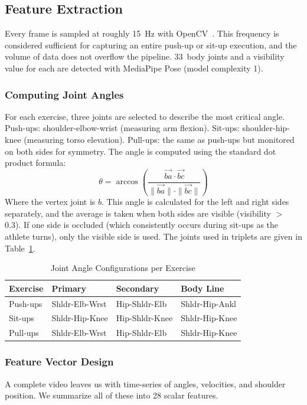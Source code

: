 \documentclass[conference]{IEEEtran}
\begin{document}
\subsection{Feature Extraction}

Every frame is sampled at roughly 15~Hz with OpenCV~\cite{bradski2000}. This frequency is considered sufficient for capturing an entire push-up or sit-up execution, and the volume of data does not overflow the pipeline. 33~body joints and a visibility value for each are detected with MediaPipe Pose (model complexity 1).

\subsubsection{Computing Joint Angles}
For each exercise, three joints are selected to describe the most critical angle. Push-ups: shoulder-elbow-wrist (measuring arm flexion). Sit-ups: shoulder-hip-knee (measuring torso elevation). Pull-ups: the same as push-ups but monitored on both sides for symmetry. The angle is computed using the standard dot product formula:
\begin{equation}
\theta = \arccos\!\left(\frac{\vec{ba} \cdot \vec{bc}}{\|\vec{ba}\| \cdot \|\vec{bc}\|}\right)
\label{eq:angle}
\end{equation}
Where the vertex joint is $b$. This angle is calculated for the left and right sides separately, and the average is taken when both sides are visible (visibility $>$ 0.3). If one side is occluded (which consistently occurs during sit-ups as the athlete turns), only the visible side is used. The joints used in triplets are given in Table~\ref{tab:joints}.

\begin{table}[ht]
\caption{Joint Angle Configurations per Exercise}
\label{tab:joints}
\centering
\renewcommand{\arraystretch}{1.15}
\begin{tabular}{@{}llll@{}}
\toprule
\textbf{Exercise} & \textbf{Primary} & \textbf{Secondary} & \textbf{Body Line} \\
\midrule
Push-ups & Shldr-Elb-Wrst & Hip-Shldr-Elb & Shldr-Hip-Ankl \\
Sit-ups  & Shldr-Hip-Knee & Hip-Shldr-Knee & Shldr-Hip-Knee \\
Pull-ups & Shldr-Elb-Wrst & Hip-Shldr-Elb & Shldr-Hip-Knee \\
\bottomrule
\end{tabular}
\end{table}

\subsubsection{Feature Vector Design}
A complete video leaves us with time-series of angles, velocities, and shoulder position. We summarize all of these into 28 scalar features.
\end{document}
